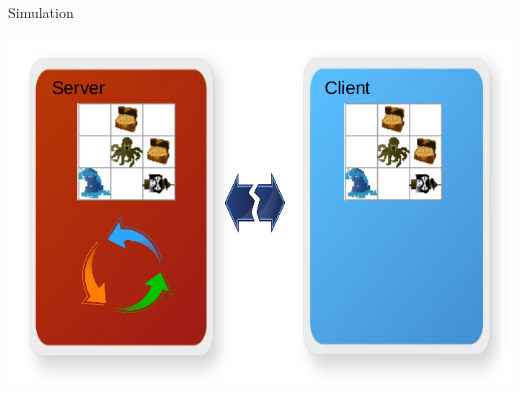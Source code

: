 \begin{frame}
	Simulation
	\begin{center}
		\includegraphics[scale=0.5]{simulation/Simulation4.jpg}
	\end{center}
\end{frame}

